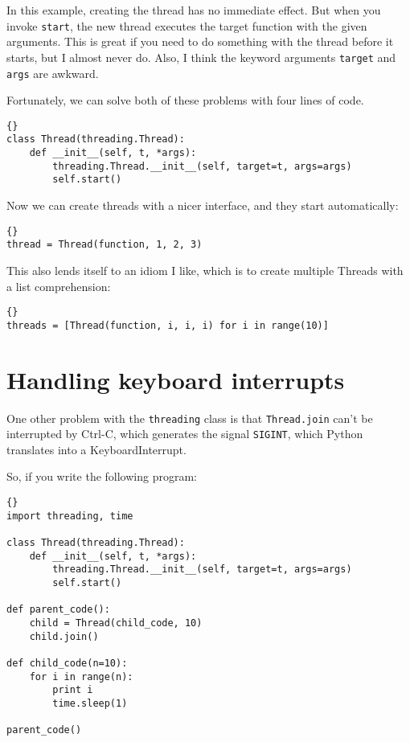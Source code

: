 In this example, creating the thread has no immediate effect.
But when you invoke {\tt start}, the new thread executes
the target function with the given arguments.
This is great if you need to do something with the thread
before it starts, but I almost never do.
Also, I think the keyword arguments {\tt target} and {\tt args}
are awkward.

Fortunately, we can solve both of these problems with four
lines of code.

\begin{lstlisting}[title={Cleaned-up Thread class}]{}
class Thread(threading.Thread):
    def __init__(self, t, *args):
        threading.Thread.__init__(self, target=t, args=args)
        self.start()
\end{lstlisting}

Now we can create threads with a nicer interface, and they
start automatically:

\begin{lstlisting}[title={Thread example (my way)}]{}
thread = Thread(function, 1, 2, 3)
\end{lstlisting}

This also lends itself to an idiom I like, which is to create
multiple Threads with a list comprehension:

\begin{lstlisting}[title={Multiple thread example}]{}
threads = [Thread(function, i, i, i) for i in range(10)]
\end{lstlisting}

\section{Handling keyboard interrupts}

One other problem with the {\tt threading} class is that 
{\tt Thread.join} can't be interrupted by Ctrl-C, which
generates the signal {\tt SIGINT}, which Python translates
into a KeyboardInterrupt.

\newpage
So, if you write the following program:

\begin{lstlisting}[title={Unstoppable program}]{}
import threading, time

class Thread(threading.Thread):
    def __init__(self, t, *args):
        threading.Thread.__init__(self, target=t, args=args)
        self.start()

def parent_code():
    child = Thread(child_code, 10)
    child.join()

def child_code(n=10):
    for i in range(n):
        print i
        time.sleep(1)
    
parent_code()
\end{lstlisting}

